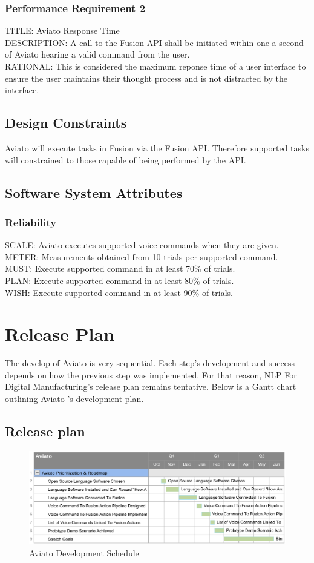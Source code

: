 \documentclass[onecolumn, draftclsnofoot,10pt, compsoc]{IEEEtran}
\def \CapstoneProjectName{NLP For Digital Manufacturing}
\def \botname{Aviato }
\begin{document}
        \subsubsection{Performance Requirement 2}
        TITLE: \botname Response Time \\
        DESCRIPTION: A call to the Fusion API shall be initiated within one a second of \botname hearing a valid command from the user. \\
        RATIONAL: This is considered the maximum reponse time of a user interface to ensure the user maintains their thought process and is not distracted by the interface.
        
    \subsection{Design Constraints}
        \botname will execute tasks in Fusion via the Fusion API. 
        Therefore supported tasks will constrained to those capable of being performed by the API.
        
    \subsection{Software System Attributes}
	   	\subsubsection{Reliability}
	   	SCALE: \botname executes supported voice commands when they are given. 
	   	METER: Measurements obtained from 10 trials per supported command.\\
	   	MUST: Execute supported command in at least 70\% of trials.\\
	   	PLAN: Execute supported command in at least 80\% of trials.\\
        WISH: Execute supported command in at least 90\% of trials.\\
   
\section{Release Plan}
	The develop of \botname is very sequential. Each step's development and success depends on how the previous step was implemented. For that reason, \CapstoneProjectName's release plan remains tentative. Below is a Gantt chart outlining \botname's development plan.
    \subsection{Release plan}
    	\begin{figure}[H]
    		\includegraphics[width=1\textwidth]{ganttChart.eps}
    		\centering
    		\caption{\botname Development Schedule}
   			\label{fig:developmentSchedule1}
    	\end{figure}


% 
%
\end{document}
